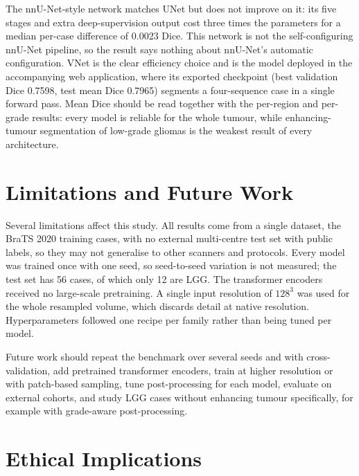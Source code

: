 \documentclass[final,3p,times,number]{elsarticle}
\begin{document}
The nnU-Net-style network matches UNet but does not improve on it: its five stages and extra deep-supervision output cost three times the parameters for a median per-case difference of 0.0023 Dice. This network is not the self-configuring nnU-Net pipeline, so the result says nothing about nnU-Net's automatic configuration. VNet is the clear efficiency choice and is the model deployed in the accompanying web application, where its exported checkpoint (best validation Dice 0.7598, test mean Dice 0.7965) segments a four-sequence case in a single forward pass. Mean Dice should be read together with the per-region and per-grade results: every model is reliable for the whole tumour, while enhancing-tumour segmentation of low-grade gliomas is the weakest result of every architecture.

\section{Limitations and Future Work}

Several limitations affect this study. All results come from a single dataset, the BraTS 2020 training cases, with no external multi-centre test set with public labels, so they may not generalise to other scanners and protocols. Every model was trained once with one seed, so seed-to-seed variation is not measured; the test set has 56 cases, of which only 12 are LGG. The transformer encoders received no large-scale pretraining. A single input resolution of $128^3$ was used for the whole resampled volume, which discards detail at native resolution. Hyperparameters followed one recipe per family rather than being tuned per model.

Future work should repeat the benchmark over several seeds and with cross-validation, add pretrained transformer encoders, train at higher resolution or with patch-based sampling, tune post-processing for each model, evaluate on external cohorts, and study LGG cases without enhancing tumour specifically, for example with grade-aware post-processing.

\section{Ethical Implications}
\end{document}
